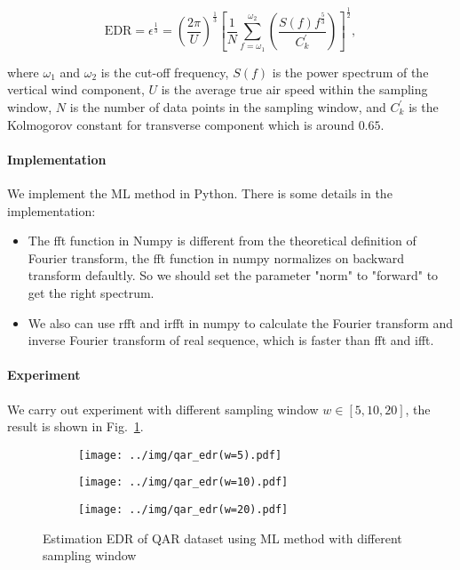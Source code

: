 \documentclass[runningheads]{llncs}
\begin{document}
\begin{equation}
    \mbox{EDR}=\epsilon^{\frac13}=\left(\frac{2\pi}{U}\right)^{\frac13}\left[\frac1N \sum_{f=\omega_1}^{\omega_2}\left(\frac{S(f)f^{\frac53}}{C^{'}_k}\right)\right]^{\frac12},
\end{equation}

where $\omega_1$ and $\omega_2$ is the cut-off frequency, $S(f)$ is the power spectrum of the vertical wind component, $U$ is the average true air speed within the sampling window, $N$ is the number of data points in the sampling window, and $C^{'}_k$ is the Kolmogorov constant for transverse component which is around $0.65$.

\paragraph{Implementation}

We implement the ML method in Python. There is some details in the implementation:

\begin{itemize}
    \item The fft function in Numpy\cite{fft} is different from the theoretical definition of Fourier transform, the fft function in numpy normalizes on backward transform defaultly. 
    So we should set the parameter "norm" to "forward" to get the right spectrum.
    \item We also can use rfft and irfft in numpy to calculate the Fourier transform and inverse Fourier transform of real sequence, which is faster than fft and ifft.
\end{itemize}

\paragraph{Experiment}

We carry out experiment with different sampling window $w \in [5,10,20]$, the result is shown in Fig.~\ref{fig:2}.

\begin{figure}
    \centering
    \begin{subfigure}{.4\textwidth}
        \centering
        \texttt{[image: ../img/qar\_edr(w=5).pdf]}
    \end{subfigure}
    \begin{subfigure}{.4\textwidth}
        \centering
        \texttt{[image: ../img/qar\_edr(w=10).pdf]}
    \end{subfigure}
    \begin{subfigure}{.4\textwidth}
        \centering
        \texttt{[image: ../img/qar\_edr(w=20).pdf]}
    \end{subfigure}
    \caption{Estimation EDR of QAR dataset using ML method with different sampling window}
    \label{fig:2}
\end{figure}
\end{document}
